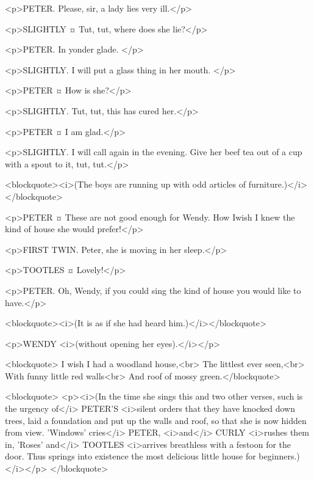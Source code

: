 <p>PETER. Please, sir, a lady lies very ill.</p>

<p>SLIGHTLY ¤
Tut, tut, where does she lie?</p>

<p>PETER. In yonder glade.
</p>

<p>SLIGHTLY. I will put a glass thing in her mouth.
</p>

<p>PETER ¤
How is she?</p>

<p>SLIGHTLY. Tut, tut, this has cured her.</p>

<p>PETER ¤
I am glad.</p>

<p>SLIGHTLY. I will call again in the evening. Give her beef tea out of a cup with a spout to it, tut, tut.</p>

<blockquote><i>(The boys are running up with odd articles of furniture.)</i></blockquote>

<p>PETER ¤
These are not good enough for Wendy. How Iwish I knew the kind of house she would prefer!</p>

<p>FIRST TWIN. Peter, she is moving in her sleep.</p>

<p>TOOTLES ¤
Lovely!</p>

<p>PETER. Oh, Wendy, if you could sing the kind of house you would like to have.</p>

<blockquote><i>(It is as if she had heard him.)</i></blockquote>

<p>WENDY <i>(without opening her eyes).</i></p>

<blockquote> I wish I had a woodland house,<br> The littlest ever seen,<br> With funny little red walls<br> And roof of mossy green.</blockquote>

<blockquote> <p><i>(In the time she sings this and two other verses, such is the urgency of</i> PETER'S <i>silent orders that they have knocked down trees, laid a foundation and put up the walls and roof, so that she is now hidden from view. 'Windows' cries</i> PETER, <i>and</i> CURLY <i>rushes them in, 'Roses' and</i> TOOTLES <i>arrives breathless with a festoon for the door. Thus springs into existence the most delicious little house for beginners.)</i></p> </blockquote>

